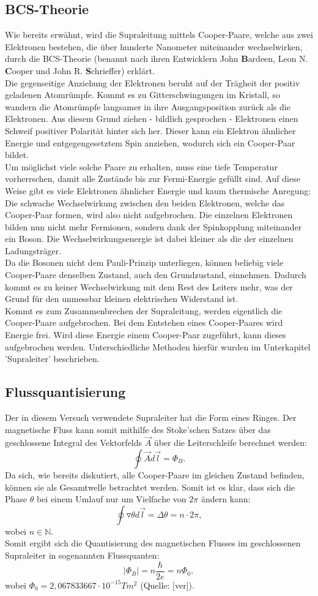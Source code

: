 \subsection{BCS-Theorie}
Wie bereits erwähnt, wird die Supraleitung mittels Cooper-Paare, welche aus zwei Elektronen bestehen, die über hunderte Nanometer miteinander wechselwirken, durch die BCS-Theorie (benannt nach ihren Entwicklern John \textbf{B}ardeen, Leon N. \textbf{C}ooper und John R. \textbf{S}chrieffer) erklärt.\\
Die gegenseitige Anziehung der Elektronen beruht auf der Trägheit der positiv geladenen Atomrümpfe. Kommt es zu Gitterschwingungen im Kristall, so wandern die Atomrümpfe langsamer in ihre Ausgangsposition zurück als die Elektronen. Aus diesem Grund ziehen - bildlich gesprochen - Elektronen einen Schweif positiver Polarität hinter sich her. Dieser kann ein Elektron ähnlicher Energie und entgegengesetztem Spin anziehen, wodurch sich ein Cooper-Paar bildet. \\
Um möglichst viele solche Paare zu erhalten, muss eine tiefe Temperatur vorherrschen, damit alle Zustände bis zur Fermi-Energie gefüllt sind. Auf diese Weise gibt es viele Elektronen ähnlicher Energie und kaum thermische Anregung: Die schwache Wechselwirkung zwischen den beiden Elektronen, welche das Cooper-Paar formen, wird also nicht aufgebrochen. Die einzelnen Elektronen bilden nun nicht mehr Fermionen, sondern dank der Spinkopplung miteinander ein Boson. Die Wechselwirkungsenergie ist dabei kleiner als die der einzelnen Ladungsträger.\\
Da die Bosonen nicht dem Pauli-Prinzip unterliegen, können beliebig viele Cooper-Paare denselben Zustand, auch den Grundzustand, einnehmen. Dadurch kommt es zu keiner Wechselwirkung mit dem Rest des Leiters mehr, was der Grund für den unmessbar kleinen elektrischen Widerstand ist. \\
Kommt es zum Zusammenbrechen der Supraleitung, werden eigentlich die Cooper-Paare aufgebrochen. Bei dem Entstehen eines Cooper-Paares wird Energie frei. Wird diese Energie einem Cooper-Paar zugeführt, kann dieses aufgebrochen werden. Unterschiedliche Methoden hierfür wurden im Unterkapitel 'Supraleiter' beschrieben.
\subsection{Flussquantisierung}
Der in diesem Versuch verwendete Supraleiter hat die Form eines Ringes. Der magnetische Fluss kann somit mithilfe des Stoke'schen Satzes über das geschlossene Integral des Vektorfelds $\vec{A}$ über die Leiterschleife berechnet werden: 
\[\oint\vec{A}d\vec{l}=\Phi_{B}.\]
Da sich, wie bereits diskutiert, alle Cooper-Paare im gleichen Zustand befinden, können sie als Gesamtwelle betrachtet werden. Somit ist es klar, dass sich die Phase $\theta$ bei einem Umlauf nur um Vielfache von $2\pi$ ändern kann: 
\[\oint\triangledown\theta d\vec{l}=\Delta\theta=n\cdot 2\pi,\] 
wobei $n\in\mathbb{N}$.\\
Somit ergibt sich die Quantisierung des magnetischen Flusses im geschlossenen Supraleiter in sogenannten Flussquanten: 
\[\left|\Phi_{B}\right|=n\frac{\hbar}{2e}=n\Phi_{0},\]
wobei $\Phi_{0}=2,067833667\cdot10^{-15}Tm^{2}$ (Quelle: [ver]).
